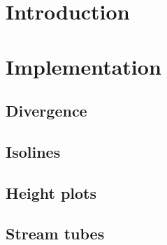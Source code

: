 
\section{Introduction}
\label{sec:introduction}

\clearpage

\section{Implementation}
\label{sec:implementation}

\clearpage

\subsection{Divergence}
\label{sec:divergence}

\clearpage
\subsection{Isolines}
\label{sec:isolines}

\clearpage
\subsection{Height plots}
\label{sec:heightplots}

\clearpage
\subsection{Stream tubes}
\label{sec:streamtubes}

% 

%